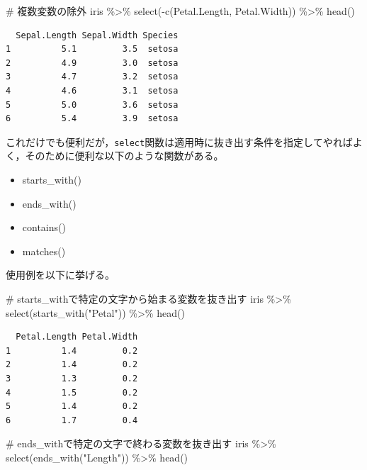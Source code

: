 \documentclass[
  a4paper,
]{ltjsbook}
\newenvironment{Shaded}{\begin{snugshade}}{\end{snugshade}}
\newcommand{\CommentTok}[1]{\textcolor[rgb]{0.37,0.37,0.37}{#1}}
\newcommand{\FunctionTok}[1]{\textcolor[rgb]{0.28,0.35,0.67}{#1}}
\newcommand{\NormalTok}[1]{\textcolor[rgb]{0.00,0.23,0.31}{#1}}
\newcommand{\SpecialCharTok}[1]{\textcolor[rgb]{0.37,0.37,0.37}{#1}}
\newcommand{\StringTok}[1]{\textcolor[rgb]{0.13,0.47,0.30}{#1}}
\providecommand{\tightlist}{%
  \setlength{\itemsep}{0pt}\setlength{\parskip}{0pt}}\usepackage{longtable,booktabs,array}
\begin{document}
\begin{Shaded}
\begin{Highlighting}[]
\CommentTok{\# 複数変数の除外}
\NormalTok{iris }\SpecialCharTok{\%\textgreater{}\%}
  \FunctionTok{select}\NormalTok{(}\SpecialCharTok{{-}}\FunctionTok{c}\NormalTok{(Petal.Length, Petal.Width)) }\SpecialCharTok{\%\textgreater{}\%}
  \FunctionTok{head}\NormalTok{()}
\end{Highlighting}
\end{Shaded}

\begin{verbatim}
  Sepal.Length Sepal.Width Species
1          5.1         3.5  setosa
2          4.9         3.0  setosa
3          4.7         3.2  setosa
4          4.6         3.1  setosa
5          5.0         3.6  setosa
6          5.4         3.9  setosa
\end{verbatim}

これだけでも便利だが，\texttt{select}関数は適用時に抜き出す条件を指定してやればよく，そのために便利な以下のような関数がある。

\begin{itemize}
\tightlist
\item
  starts\_with()
\item
  ends\_with()
\item
  contains()
\item
  matches()
\end{itemize}

使用例を以下に挙げる。

\begin{Shaded}
\begin{Highlighting}[]
\CommentTok{\# starts\_withで特定の文字から始まる変数を抜き出す}
\NormalTok{iris }\SpecialCharTok{\%\textgreater{}\%}
  \FunctionTok{select}\NormalTok{(}\FunctionTok{starts\_with}\NormalTok{(}\StringTok{"Petal"}\NormalTok{)) }\SpecialCharTok{\%\textgreater{}\%}
  \FunctionTok{head}\NormalTok{()}
\end{Highlighting}
\end{Shaded}

\begin{verbatim}
  Petal.Length Petal.Width
1          1.4         0.2
2          1.4         0.2
3          1.3         0.2
4          1.5         0.2
5          1.4         0.2
6          1.7         0.4
\end{verbatim}

\begin{Shaded}
\begin{Highlighting}[]
\CommentTok{\# ends\_withで特定の文字で終わる変数を抜き出す}
\NormalTok{iris }\SpecialCharTok{\%\textgreater{}\%}
  \FunctionTok{select}\NormalTok{(}\FunctionTok{ends\_with}\NormalTok{(}\StringTok{"Length"}\NormalTok{)) }\SpecialCharTok{\%\textgreater{}\%}
  \FunctionTok{head}\NormalTok{()}
\end{Highlighting}
\end{Shaded}
\end{document}
